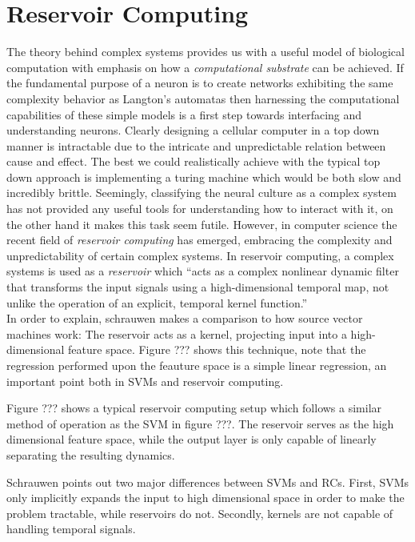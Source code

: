 \section{Reservoir Computing}
The theory behind complex systems provides us with a useful model of biological
computation with emphasis on how a \emph{computational substrate} can be
achieved.
If the fundamental purpose of a neuron is to create networks exhibiting the same
complexity behavior as Langton's automatas then harnessing the computational
capabilities of these simple models is a first step towards interfacing and
understanding neurons.
Clearly designing a cellular computer in a top down manner is intractable due to
the intricate and unpredictable relation between cause and effect.
The best we could realistically achieve with the typical top down approach is
implementing a turing machine which would be both slow and incredibly brittle.
Seemingly, classifying the neural culture as a complex system has not provided
any useful tools for understanding how to interact with it, on the other hand it
makes this task seem futile.
However, in computer science the recent field of
\emph{reservoir computing} has emerged, embracing the complexity and unpredictability
of certain complex systems.
In reservoir computing, a complex systems is used as a \textit{reservoir}
\cite{schrauwen_overview_2007} which
``acts as a complex nonlinear dynamic filter that transforms the
input signals using a high-dimensional temporal map, not unlike the operation
of an explicit, temporal kernel function.''\\

In order to explain, schrauwen makes a comparison to how source
vector machines work: The reservoir acts as a kernel, projecting input into a
high-dimensional feature space.
Figure ??? shows this technique, note that the regression performed upon the
feauture space is a simple linear regression, an important point both in SVMs
and reservoir computing.

Figure ??? shows a typical reservoir computing setup which follows a similar
method of operation as the SVM in figure ???.
The reservoir serves as the high dimensional feature space, while the output
layer is only capable of linearly separating the resulting dynamics.

Schrauwen points out two major differences between SVMs and RCs.
First, SVMs only implicitly expands the input to high dimensional space in order
to make the problem tractable, while reservoirs do not.
Secondly, kernels are not capable of handling temporal signals.

